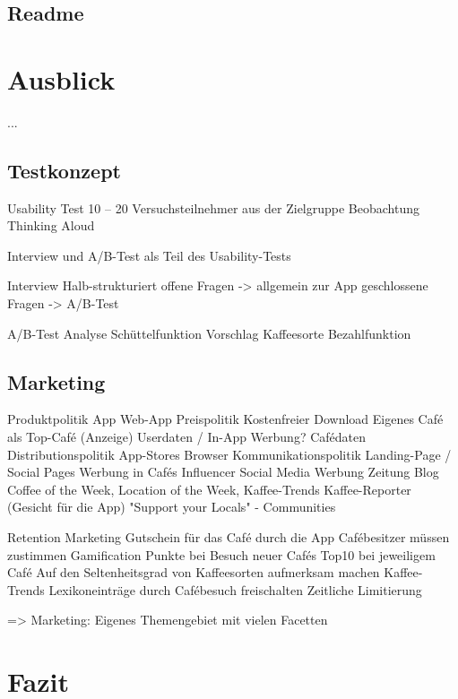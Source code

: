 \section{Readme}






\chapter{Ausblick}
\label{ausblick}
...


\section{Testkonzept}

Usability Test
10 – 20 Versuchsteilnehmer aus der Zielgruppe
Beobachtung
Thinking Aloud

Interview und A/B-Test als Teil des Usability-Tests


Interview
Halb-strukturiert
offene Fragen -> allgemein zur App
geschlossene Fragen ->   A/B-Test

A/B-Test
Analyse Schüttelfunktion
Vorschlag Kaffeesorte
Bezahlfunktion



\section{Marketing}
Produktpolitik
App
Web-App
Preispolitik
Kostenfreier Download
Eigenes Café als Top-Café (Anzeige)
Userdaten / In-App Werbung?
Cafédaten
Distributionspolitik
App-Stores
Browser
Kommunikationspolitik
Landing-Page / Social Pages
Werbung in Cafés
Influencer
Social Media Werbung
Zeitung
Blog
Coffee of the Week, Location of the Week, Kaffee-Trends
Kaffee-Reporter (Gesicht für die App)
"Support your Locals" - Communities

Retention Marketing
Gutschein für das Café durch die App
Cafébesitzer müssen zustimmen
Gamification
Punkte bei Besuch neuer Cafés
Top10 bei jeweiligem Café
Auf den Seltenheitsgrad von Kaffeesorten aufmerksam machen
Kaffee-Trends
Lexikoneinträge durch Cafébesuch freischalten
Zeitliche Limitierung

=> Marketing: Eigenes Themengebiet mit vielen Facetten






\chapter{Fazit}
\label{fazit}


